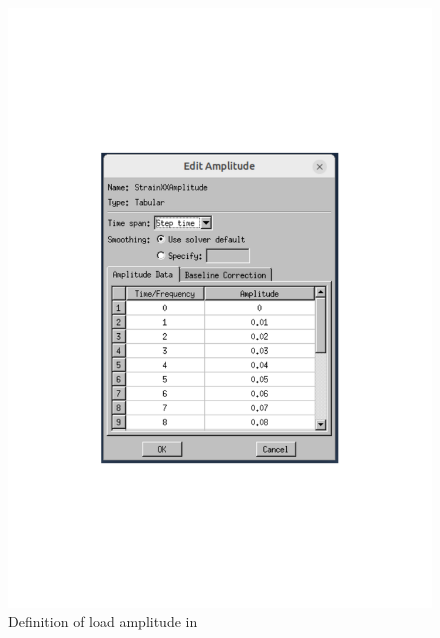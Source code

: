     \begin{figure}[H]
    \centering
    \begin{minipage}[T!]{1.0\textwidth}
        \centering
        \begin{minipage}[T!][9cm][T!]{0.35\textwidth}
            \includegraphics[width=1.0\textwidth]{Amplitude.pdf}
            \vfill{}
            \caption{Definition of load amplitude in }
            \label{fig:amplitudemenu}
        \end{minipage}
        \hspace{0.08\textwidth} %
        \begin{minipage}[T!][9cm][T!]{0.35\textwidth}

\end{minipage}
\end{minipage}
\end{figure}
